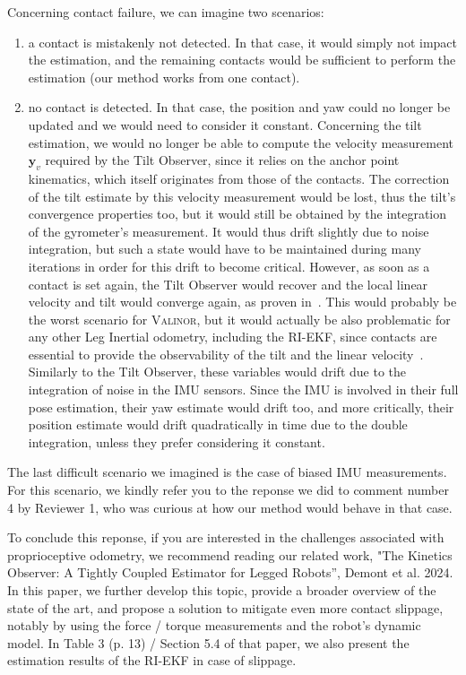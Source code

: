 Concerning contact failure, we can imagine two scenarios:
\begin{enumerate}
    \item a contact is mistakenly not detected. In that case, it would simply not impact the estimation, and the remaining contacts would be sufficient to perform the estimation (our method works from one contact).
    \item no contact is detected. In that case, the position and yaw could no longer be updated and we would need to consider it constant. Concerning the tilt estimation, we would no longer be able to compute the velocity measurement $\boldsymbol{y}_v$ required by the Tilt Observer, since it relies on the anchor point kinematics, which itself originates from those of the contacts. The correction of the tilt estimate by this velocity measurement would be lost, thus the tilt's convergence properties too, but it would still be obtained by the integration of the gyrometer's measurement. It would thus drift slightly due to noise integration, but such a state would have to be maintained during many iterations in order for this drift to become critical. However, as soon as a contact is set again, the Tilt Observer would recover and the local linear velocity and tilt would converge again, as proven in~\cite{benallegue2020LyapunovStableOrientationEstimatorHumanoids}.
    This would probably be the worst scenario for {\scshape Valinor}, but it would actually be also problematic for any other Leg Inertial odometry, including the RI-EKF, since contacts are essential to provide the observability of the tilt and the linear velocity~\cite{bloesch2013FusionLegKineAndImu}. Similarly to the Tilt Observer, these variables would drift due to the integration of noise in the IMU sensors. Since the IMU is involved in their full pose estimation, their yaw estimate would drift too, and more critically, their position estimate would drift quadratically in time due to the double integration, unless they prefer considering it constant.
\end{enumerate}

The last difficult scenario we imagined is the case of biased IMU measurements. For this scenario, we kindly refer you to the reponse we did to comment number 4 by Reviewer 1, who was curious at how our method would behave in that case.

To conclude this reponse, if you are interested in the challenges associated with proprioceptive odometry, we recommend reading our related work, "The Kinetics Observer: A Tightly Coupled Estimator for Legged Robots”, Demont et al. 2024. In this paper, we further develop this topic, provide a broader overview of the state of the art, and propose a solution to mitigate even more contact slippage, notably by using the force / torque measurements and the robot's dynamic model. In Table 3 (p. 13) / Section 5.4 of that paper, we also present the estimation results of the RI-EKF in case of slippage.



